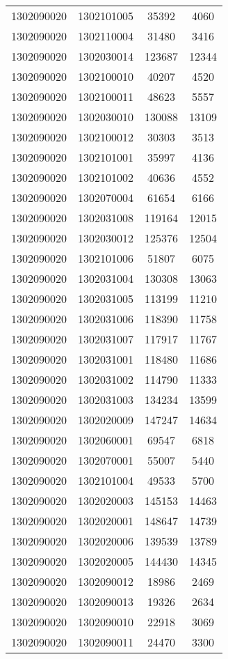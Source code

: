 \begin{longtable}{llcc}
1302090020 & 1302101005 & 35392 & 4060\\
1302090020 & 1302110004 & 31480 & 3416\\
1302090020 & 1302030014 & 123687 & 12344\\
1302090020 & 1302100010 & 40207 & 4520\\
1302090020 & 1302100011 & 48623 & 5557\\
1302090020 & 1302030010 & 130088 & 13109\\
1302090020 & 1302100012 & 30303 & 3513\\
1302090020 & 1302101001 & 35997 & 4136\\
1302090020 & 1302101002 & 40636 & 4552\\
1302090020 & 1302070004 & 61654 & 6166\\
1302090020 & 1302031008 & 119164 & 12015\\
1302090020 & 1302030012 & 125376 & 12504\\
1302090020 & 1302101006 & 51807 & 6075\\
1302090020 & 1302031004 & 130308 & 13063\\
1302090020 & 1302031005 & 113199 & 11210\\
1302090020 & 1302031006 & 118390 & 11758\\
1302090020 & 1302031007 & 117917 & 11767\\
1302090020 & 1302031001 & 118480 & 11686\\
1302090020 & 1302031002 & 114790 & 11333\\
1302090020 & 1302031003 & 134234 & 13599\\
1302090020 & 1302020009 & 147247 & 14634\\
1302090020 & 1302060001 & 69547 & 6818\\
1302090020 & 1302070001 & 55007 & 5440\\
1302090020 & 1302101004 & 49533 & 5700\\
1302090020 & 1302020003 & 145153 & 14463\\
1302090020 & 1302020001 & 148647 & 14739\\
1302090020 & 1302020006 & 139539 & 13789\\
1302090020 & 1302020005 & 144430 & 14345\\
1302090020 & 1302090012 & 18986 & 2469\\
1302090020 & 1302090013 & 19326 & 2634\\
1302090020 & 1302090010 & 22918 & 3069\\
1302090020 & 1302090011 & 24470 & 3300\\

\end{longtable}
